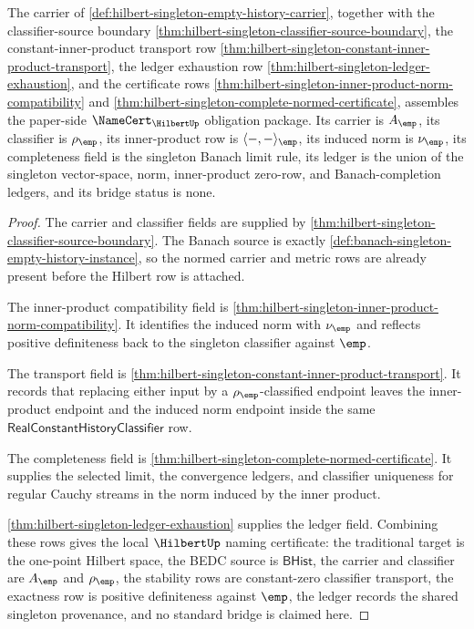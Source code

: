 \begin{theorem}
\label{thm:hilbert-namecert-obligation-package}
The carrier of
\autoref{def:hilbert-singleton-empty-history-carrier}, together with the
classifier-source boundary
\autoref{thm:hilbert-singleton-classifier-source-boundary}, the
constant-inner-product transport row
\autoref{thm:hilbert-singleton-constant-inner-product-transport}, the ledger
exhaustion row \autoref{thm:hilbert-singleton-ledger-exhaustion}, and the
certificate rows
\autoref{thm:hilbert-singleton-inner-product-norm-compatibility} and
\autoref{thm:hilbert-singleton-complete-normed-certificate}, assembles the
paper-side $\NameCert_{\HilbertUp}$ obligation package. Its carrier is
$A_{\emp}$, its classifier is $\rho_{\emp}$, its inner-product row is
$\langle-,-\rangle_{\emp}$, its induced norm is $\nu_{\emp}$, its completeness
field is the singleton Banach limit rule, its ledger is the union of the
singleton vector-space, norm, inner-product zero-row, and Banach-completion
ledgers, and its bridge status is none.
\end{theorem}
\begin{proof}
The carrier and classifier fields are supplied by
\autoref{thm:hilbert-singleton-classifier-source-boundary}. The Banach source
is exactly \autoref{def:banach-singleton-empty-history-instance}, so the
normed carrier and metric rows are already present before the Hilbert row is
attached.

The inner-product compatibility field is
\autoref{thm:hilbert-singleton-inner-product-norm-compatibility}. It identifies
the induced norm with $\nu_{\emp}$ and reflects positive definiteness back to
the singleton classifier against $\emp$.

The transport field is
\autoref{thm:hilbert-singleton-constant-inner-product-transport}. It records
that replacing either input by a $\rho_{\emp}$-classified endpoint leaves the
inner-product endpoint and the induced norm endpoint inside the same
$\mathsf{RealConstantHistoryClassifier}$ row.

The completeness field is
\autoref{thm:hilbert-singleton-complete-normed-certificate}. It supplies the
selected limit, the convergence ledgers, and classifier uniqueness for
regular Cauchy streams in the norm induced by the inner product.

\autoref{thm:hilbert-singleton-ledger-exhaustion} supplies the ledger field.
Combining these rows gives the local $\HilbertUp$ naming certificate: the
traditional target is the one-point Hilbert space, the BEDC source is
$\mathsf{BHist}$, the carrier and classifier are $A_{\emp}$ and
$\rho_{\emp}$, the stability rows are constant-zero classifier transport, the
exactness row is positive definiteness against $\emp$, the ledger records the
shared singleton provenance, and no standard bridge is claimed here.
\end{proof}

